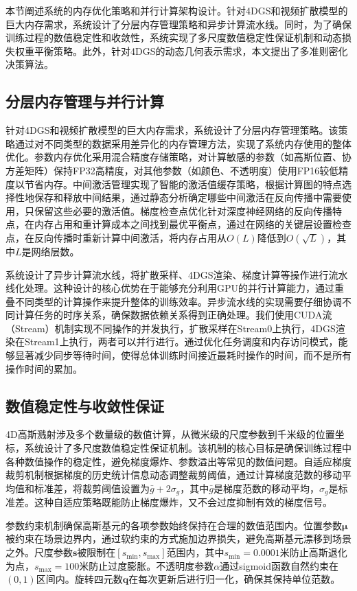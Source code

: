 本节阐述系统的内存优化策略和并行计算架构设计。针对4DGS和视频扩散模型的巨大内存需求，系统设计了分层内存管理策略和异步计算流水线。同时，为了确保训练过程的数值稳定性和收敛性，系统实现了多尺度数值稳定性保证机制和动态损失权重平衡策略。此外，针对4DGS的动态几何表示需求，本文提出了多准则密化决策算法。

\subsection{分层内存管理与并行计算}

针对4DGS和视频扩散模型的巨大内存需求，系统设计了分层内存管理策略。该策略通过对不同类型的数据采用差异化的内存管理方法，实现了系统内存使用的整体优化。参数内存优化采用混合精度存储策略，对计算敏感的参数（如高斯位置、协方差矩阵）保持FP32高精度，对其他参数（如颜色、不透明度）使用FP16较低精度以节省内存。中间激活管理实现了智能的激活值缓存策略，根据计算图的特点选择性地保存和释放中间结果，通过静态分析确定哪些中间激活在反向传播中需要使用，只保留这些必要的激活值。梯度检查点优化针对深度神经网络的反向传播特点，在内存占用和重计算成本之间找到最优平衡点，通过在网络的关键层设置检查点，在反向传播时重新计算中间激活，将内存占用从$O(L)$降低到$O(\sqrt{L})$，其中$L$是网络层数。

系统设计了异步计算流水线，将扩散采样、4DGS渲染、梯度计算等操作进行流水线化处理。这种设计的核心优势在于能够充分利用GPU的并行计算能力，通过重叠不同类型的计算操作来提升整体的训练效率。异步流水线的实现需要仔细协调不同计算任务的时序关系，确保数据依赖关系得到正确处理。我们使用CUDA流（Stream）机制实现不同操作的并发执行，扩散采样在Stream0上执行，4DGS渲染在Stream1上执行，两者可以并行进行。通过优化任务调度和内存访问模式，能够显著减少同步等待时间，使得总体训练时间接近最耗时操作的时间，而不是所有操作时间的累加。

\subsection{数值稳定性与收敛性保证}

4D高斯溅射涉及多个数量级的数值计算，从微米级的尺度参数到千米级的位置坐标，系统设计了多尺度数值稳定性保证机制。该机制的核心目标是确保训练过程中各种数值操作的稳定性，避免梯度爆炸、参数溢出等常见的数值问题。自适应梯度裁剪机制根据梯度的历史统计信息动态调整裁剪阈值，通过计算梯度范数的移动平均值和标准差，将裁剪阈值设置为$\bar{g} + 2\sigma_g$，其中$\bar{g}$是梯度范数的移动平均，$\sigma_g$是标准差。这种自适应策略既能防止梯度爆炸，又不会过度抑制有效的梯度信号。

参数约束机制确保高斯基元的各项参数始终保持在合理的数值范围内。位置参数$\boldsymbol{\mu}$被约束在场景边界内，通过软约束的方式施加边界损失，避免高斯基元漂移到场景之外。尺度参数$\mathbf{s}$被限制在$[s_{\min}, s_{\max}]$范围内，其中$s_{\min} = 0.0001$米防止高斯退化为点，$s_{\max} = 100$米防止过度膨胀。不透明度参数$\alpha$通过sigmoid函数自然约束在$(0, 1)$区间内。旋转四元数$\mathbf{q}$在每次更新后进行归一化，确保其保持单位范数。

